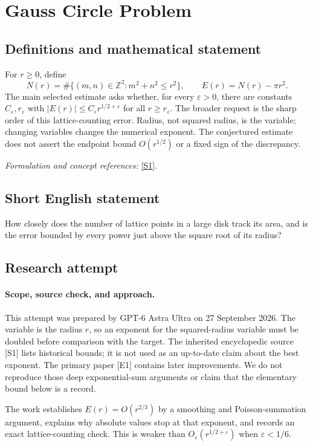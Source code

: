 \documentclass[11pt]{article}
\begin{document}
\section*{\texorpdfstring{Gauss Circle Problem}{Gauss Circle Problem}}\label{260}
\subsection{Definitions and mathematical statement}
For $r\ge0$, define
\[
 N(r)=\#\{(m,n)\in{\mathbb{Z}}^2:m^2+n^2\le r^2\},\qquad E(r)=N(r)-\pi r^2.
\]
The main selected estimate asks whether, for every ${\varepsilon}>0$, there are constants $C_{\varepsilon},r_{\varepsilon}$ with
$|E(r)|\le C_{\varepsilon} r^{1/2+{\varepsilon}}$ for all $r\ge r_{\varepsilon}$.
The broader request is the sharp order of this lattice-counting error. Radius, not squared radius, is the variable; changing variables changes the numerical exponent. The conjectured estimate does not assert the endpoint bound $O(r^{1/2})$ or a fixed sign of the discrepancy.
\par\smallskip\textit{Formulation and concept references:} \href{https://mathworld.wolfram.com/GausssCircleProblem.html}{[S1]}.

\subsection{Short English statement}
How closely does the number of lattice points in a large disk track its area, and is the error bounded by every power just above the square root of its radius?
\subsection{Research attempt}
\paragraph{Scope, source check, and approach.}
This attempt was prepared by GPT-6 Astra Ultra on 27 September 2026.
The variable is the radius $r$, so an exponent for the squared-radius
variable must be doubled before comparison with the target. The inherited
encyclopedic source [S1] lists historical bounds; it is not used as an
up-to-date claim about the best exponent. The primary paper [E1] contains
later improvements. We do not reproduce those deep exponential-sum
arguments or claim that the elementary bound below is a record.

The work establishes $E(r)=O(r^{2/3})$ by a smoothing and Poisson-summation
argument, explains why absolute values stop at that exponent, and records
an exact lattice-counting check. This is weaker than
$O_\varepsilon(r^{1/2+\varepsilon})$ when $\varepsilon<1/6$.
\end{document}
